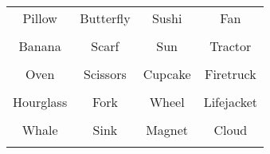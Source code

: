 \documentclass[12pt,a4paper]{article}
\begin{document}
\thispagestyle{empty}
\begin{table}[]
\centering
\Huge
\begin{tabular}{cccc}
 Pillow& Butterfly& Sushi& Fan\\  & & & \\
 Banana& Scarf& Sun& Tractor\\  & & & \\
 Oven& Scissors& Cupcake& Firetruck\\  & & & \\
 Hourglass& Fork& Wheel& Lifejacket\\  & & & \\
 Whale& Sink& Magnet& Cloud\\  & & & \\
\end{tabular}
\end{table}
\end{document}
